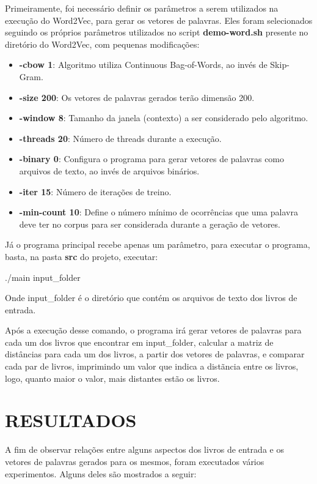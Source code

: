 \documentclass[12pt]{article}
\begin{document}
Primeiramente, foi necessário definir os parâmetros a serem utilizados na execução do Word2Vec,
para gerar os vetores de palavras. Eles foram selecionados seguindo os próprios parâmetros
utilizados no script \textbf{demo-word.sh} presente no diretório do Word2Vec, com pequenas
modificações:

\begin{itemize}
 \item \textbf{-cbow 1}: Algoritmo utiliza Continuous Bag-of-Words, ao invés de Skip-Gram.
 \item \textbf{-size 200}: Os vetores de palavras gerados terão dimensão 200.
 \item \textbf{-window 8}: Tamanho da janela (contexto) a ser considerado pelo algoritmo.
 \item \textbf{-threads 20}: Número de threads durante a execução.
 \item \textbf{-binary 0}: Configura o programa para gerar vetores de palavras como arquivos
 de texto, ao invés de arquivos binários.
 \item \textbf{-iter 15}: Número de iterações de treino.
 \item \textbf{-min-count 10}: Define o número mínimo de ocorrências que uma palavra deve ter 
 no corpus para ser considerada durante a geração de vetores.
\end{itemize}

Já o programa principal recebe apenas um parâmetro, para executar o programa, basta, na pasta
\textbf{src} do projeto, executar:

\begin{center}
 ./main input\_folder
\end{center}

Onde input\_folder é o diretório que contém os arquivos de texto dos livros de entrada.

Após a execução desse comando, o programa irá gerar vetores de palavras
para cada um dos livros que encontrar em input\_folder, calcular a matriz
de distâncias para cada um dos livros, a partir dos vetores de palavras,
e comparar cada par de livros, imprimindo um valor que indica a distãncia
entre os livros, logo, quanto maior o valor, mais distantes estão os livros.

\section{RESULTADOS}

A fim de observar relações entre alguns aspectos dos livros de entrada
e os vetores de palavras gerados para os mesmos, foram executados vários experimentos. Alguns deles são mostrados a seguir:
\end{document}
